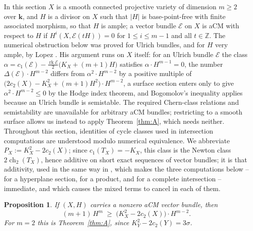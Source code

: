 \documentclass[11pt]{amsart}
\newtheorem{proposition}[theorem]{Proposition}
\theoremstyle{remark}
\theoremstyle{definition}
\newcommand{\ZZ}{\mathbb{Z}}
\newcommand{\bk}{\mathbf{k}}
\newcommand{\cE}{\mathcal{E}}
\newcommand{\rk}{\operatorname{rk}}
\begin{document}
In this section $X$ is a smooth connected projective variety of dimension $m\ge2$ over $\bk$, and $H$ is a divisor on $X$ such that $|H|$ is base-point-free with finite associated morphism, so that $H$ is ample; a vector bundle $\cE$ on $X$ is aCM with respect to $H$ if $H^i(X,\cE(tH))=0$ for $1\le i\le m-1$ and all $t\in\ZZ$. The numerical obstruction below was proved for Ulrich bundles, and for $H$ very ample, by Lopez \cite[Lem.~3.1]{Lo}. His argument runs on $X$ itself: for an Ulrich bundle $\cE$ the class $\alpha=c_1(\cE)-\tfrac{\rk\cE}2\bigl(K_X+(m+1)H\bigr)$ satisfies $\alpha\cdot H^{m-1}=0$, the number $\Delta(\cE)\cdot H^{m-2}$ differs from $\alpha^2\cdot H^{m-2}$ by a positive multiple of $\bigl(2c_2(X)-K_X^2+(m+1)H^2\bigr)\cdot H^{m-2}$, a surface section enters only to give $\alpha^2\cdot H^{m-2}\le0$ by the Hodge index theorem, and Bogomolov's inequality applies because an Ulrich bundle is semistable. The required Chern-class relations and semistability are unavailable for arbitrary aCM bundles; restricting to a smooth surface allows us instead to apply Theorem~\ref{thm:A}, which needs neither. Throughout this section, identities of cycle classes used in intersection computations are understood modulo numerical equivalence. We abbreviate $P_X:=K_X^2-2c_2(X)$; since $c_1(T_X)=-K_X$, this class is the Newton class $2\operatorname{ch}_2(T_X)$, hence additive on short exact sequences of vector bundles; it is that additivity, used in the same way in \cite[\S2]{Lo}, which makes the three computations below -- for a hyperplane section, for a product, and for a complete intersection -- immediate, and which causes the mixed terms to cancel in each of them.

\begin{proposition}\label{prop:higher}
If $(X,H)$ carries a nonzero aCM vector bundle, then
\begin{equation}\label{eq:higher}
(m+1)\,H^m\;\ge\;\bigl(K_X^2-2c_2(X)\bigr)\cdot H^{m-2}.
\end{equation}
For $m=2$ this is Theorem~\ref{thm:A}, since $K_Y^2-2c_2(Y)=3\sigma$.
\end{proposition}
\end{document}
